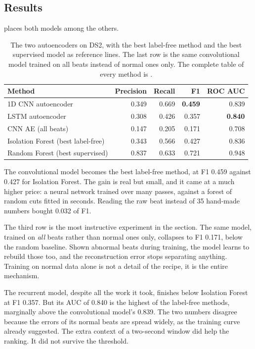 \documentclass[a4paper, 12pt]{article}
\begin{document}
\subsection{Results} \label{subsec:aeresults}

 places both models among the others.

\begin{table}[htbp]
  \centering
  \small
  \caption{The two autoencoders on DS2, with the best label-free method and the
  best supervised model as reference lines. The last row is the same convolutional
  model trained on all beats instead of normal ones only. The complete table of
  every method is .}
  \label{tab:aeresults}
  \begin{tabular}{@{}lrrrr@{}}
    \toprule
    \textbf{Method} & \textbf{Precision} & \textbf{Recall} & \textbf{F1}
      & \textbf{ROC AUC} \\
    \midrule
    1D CNN autoencoder   & 0.349 & 0.669 & \textbf{0.459} & 0.839 \\
    LSTM autoencoder     & 0.308 & 0.426 & 0.357 & \textbf{0.840} \\
    CNN AE (all beats)   & 0.147 & 0.205 & 0.171 & 0.708 \\
    \midrule
    Isolation Forest (best label-free) & 0.343 & 0.566 & 0.427 & 0.836 \\
    Random Forest (best supervised)    & 0.837 & 0.633 & 0.721 & 0.948 \\
    \bottomrule
  \end{tabular}
\end{table}

The convolutional model becomes the best label-free method, at F1 \num{0.459}
against \num{0.427} for Isolation Forest. The gain is real but small, and it came
at a much higher price: a neural network trained over many passes, against a
forest of random cuts fitted in seconds. Reading the raw beat instead of 35
hand-made numbers bought \num{0.032} of F1.

The third row is the most instructive experiment in the section. The
same model, trained on \emph{all} beats rather than normal ones only, collapses to
F1 \num{0.171}, below the random baseline. Shown abnormal beats during training,
the model learns to rebuild those too, and the reconstruction error stops
separating anything. Training on normal data alone is not a detail of the recipe,
it is the entire mechanism.

The recurrent model, despite all the work it took, finishes below Isolation
Forest at F1 \num{0.357}. But its AUC of \num{0.840} is the highest of the
label-free methods, marginally above the convolutional model's \num{0.839}. The
two numbers disagree because the errors of its normal beats are spread widely, as
the training curve already suggested. The extra context of a two-second window did
help the ranking. It did not survive the threshold.
\end{document}
